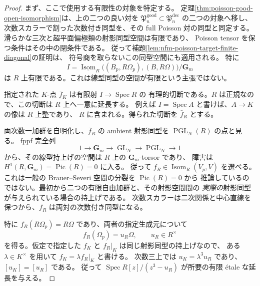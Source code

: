 \begin{proof}
まず、ここで使用する有限性の対象を特定する。
定理\ref{thm:poisson-good-open-isomorphism}は、上の二つの良い対を
$\mathfrak P_n^{\mathrm{good}}\subset\mathfrak P_n^{\mathrm{dec}}$ の二つの対象へ移し、
次数スカラーで割った次数付き同型を、その full Poisson 対の同型と同定する。
滑らかな三次と超平面偏極類の射影同型空間は有限であり、
Poisson tensor を保つ条件はその中の閉条件である。
従って補題\ref{lem:nfm-poisson-target-finite-diagonal}の証明は、
符号商を取らないこの同型空間にも適用される。
特に
\[
 I=\underline{\operatorname{Isom}}_R
       \bigl((B_p,R\Omega_p),(B,R\Omega)\bigr)/\mathbf G_m
\]
は $R$ 上有限である。これは線型同型の空間が有限という主張ではない。

指定された $K$-点 $\bar f_K$ は有限射 $I\to\operatorname{Spec}R$ の
有理的切断である。$R$ は正規なので、この切断は $R$ 上へ一意に延長する。
例えば $I=\operatorname{Spec}A$ と書けば、$A\to K$ の像は $R$ 上整であり、
$R$ に含まれる。得られた切断を $\bar f_R$ とする。

両次数一加群を自明化し、$\bar f_R$ の ambient 射影同型を
$\operatorname{PGL}_N(R)$ の点と見る。
fppf 完全列
\[
 1\longrightarrow\mathbf G_m\longrightarrow\operatorname{GL}_N
       \longrightarrow\operatorname{PGL}_N\longrightarrow1
\]
から、その線型持上げの空間は $R$ 上の $\mathbf G_m$-torsor であり、
障害は $H^1(R,\mathbf G_m)=\operatorname{Pic}(R)=0$ に入る。
従って $f_R\in\operatorname{Isom}_R(V_p,V)$ を選べる。
これは一般の Brauer--Severi 空間の分裂を $\operatorname{Pic}(R)=0$ から
推論しているのではない。最初から二つの有限自由加群と、その射影空間間の
\emph{実際の}射影同型が与えられている場合の持上げである。
次数スカラーは二次関係と中心直線を保つから、$f_R$ は両対の次数付き同型になる。

特に $f_R(R\Omega_p)=R\Omega$ であり、両者の指定生成元について
\[
 f_R(\Omega_p)=u_R\Omega,\qquad u_R\in R^\times
\]
を得る。仮定で指定した $f_K$ と $f_R|_K$ は同じ射影同型の持上げなので、
ある $\lambda\in K^\times$ を用いて $f_K=\lambda f_R|_K$ と書ける。
次数三上では $u_K=\lambda^3u_R$ であり、$[u_K]=[u_R]$ である。
従って $\operatorname{Spec}R[z]/(z^3-u_R)$ が所要の有限 \'etale な延長を与える。
\end{proof}

